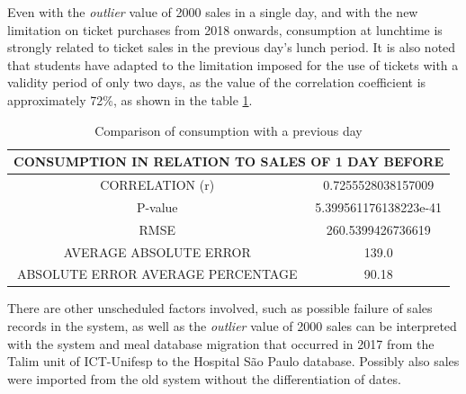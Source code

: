         \begin{figure}[h]
                    \end{figure}
	        
       Even with the \textit{outlier} value of 2000 sales in a single day, and with the new limitation on ticket purchases from 2018 onwards, consumption at lunchtime is strongly related to ticket sales in the previous day's lunch period. It is also noted that students have adapted to the limitation imposed for the use of tickets with a validity period of only two days, as the value of the correlation coefficient is approximately 72\%, as shown in the table \ref{table:case1_vendas1}.
        
 \begin{table}[!htpb]
           \centering
           \caption{Comparison of consumption with a previous day}
             \begin{tabular}{c|c}\hline
                \multicolumn{2}{c}{CONSUMPTION IN RELATION TO SALES OF 1 DAY BEFORE}\\ \hline
                CORRELATION (r) &  0.7255528038157009\\
                P-value &5.399561176138223e-41\\
                RMSE & 260.5399426736619\\
                AVERAGE ABSOLUTE ERROR & 139.0\\
                ABSOLUTE ERROR AVERAGE PERCENTAGE & 90.18\\\hline
            \end{tabular} \label{table:case1_vendas1} \end{table}
    	            

        
        There are other unscheduled factors involved, such as possible failure of sales records in the system, as well as the \textit{outlier} value of 2000 sales can be interpreted with the system and meal database migration that occurred in 2017 from the Talim unit of ICT-Unifesp to the Hospital São Paulo database. Possibly also sales were imported from the old system without the differentiation of dates.
        
